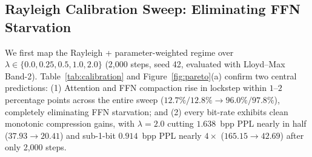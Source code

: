 \documentclass[11pt,a4paper]{article}
\begin{document}
\subsection{Rayleigh Calibration Sweep: Eliminating FFN Starvation}
We first map the Rayleigh + parameter-weighted regime over $\lambda \in \{0.0, 0.25, 0.5, 1.0, 2.0\}$ (2,000 steps, seed 42, evaluated with Lloyd--Max Band-2). Table~\ref{tab:calibration} and Figure~\ref{fig:pareto}(a) confirm two central predictions: (1) Attention and FFN compaction rise in lockstep within $1$--$2$ percentage points across the entire sweep ($12.7\%/12.8\% \to 96.0\%/97.8\%$), completely eliminating FFN starvation; and (2) every bit-rate exhibits clean monotonic compression gains, with $\lambda = 2.0$ cutting $1.638$~bpp PPL nearly in half ($37.93 \to 20.41$) and sub-1-bit $0.914$~bpp PPL nearly $4\times$ ($165.15 \to 42.69$) after only 2,000 steps.

\begin{table}[t]
    \centering
    \small
    \caption{\textbf{Rayleigh + Parameter-Weighted Calibration Sweep (TinyStories-10M, 2,000 steps, seed 42, A10G).} Attention ($256\times256$) and FFN ($256\times1024$) compaction match within $\le 1.8\%$ across all $\lambda$.}
    \label{tab:calibration}
\end{table}
\end{document}
